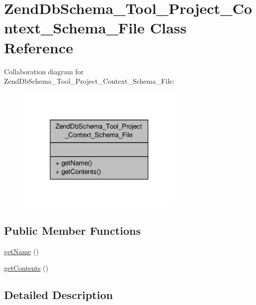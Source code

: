 \hypertarget{classZendDbSchema__Tool__Project__Context__Schema__File}{\section{Zend\-Db\-Schema\-\_\-\-Tool\-\_\-\-Project\-\_\-\-Context\-\_\-\-Schema\-\_\-\-File Class Reference}
\label{classZendDbSchema__Tool__Project__Context__Schema__File}
}


Collaboration diagram for Zend\-Db\-Schema\-\_\-\-Tool\-\_\-\-Project\-\_\-\-Context\-\_\-\-Schema\-\_\-\-File\-:\nopagebreak
\begin{figure}[H]
\begin{center}
\leavevmode
\includegraphics[width=226pt]{classZendDbSchema__Tool__Project__Context__Schema__File__coll__graph}
\end{center}
\end{figure}
\subsection*{Public Member Functions}
\begin{DoxyCompactItemize}
\item 
\hyperlink{classZendDbSchema__Tool__Project__Context__Schema__File_ad1098bd539f1d6ccedca2e6560d72707}{get\-Name} ()
\item 
\hyperlink{classZendDbSchema__Tool__Project__Context__Schema__File_ad4a0c4835b8b1948e4118d1069a894ba}{get\-Contents} ()
\end{DoxyCompactItemize}


\subsection{Detailed Description}


